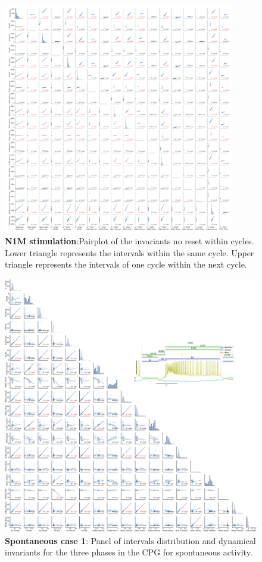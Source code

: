 \begin{figure}[htbp]
	\centering
	\includegraphics[width=0.9\textwidth]{./invariants/data/MODEL/n1m_driven/images/3phases/_output_pairplot_reset.png}
	\caption{\textbf{N1M stimulation}:Pairplot of the invariants no reset within cycles. Lower triangle represents the intervals within the same cycle. Upper triangle represents the intervals of one cycle within the next cycle. }
	\label{fig:N1M stimulation pairplot reset}
\end{figure}

\begin{figure}[htbp]
	\centering
	\includegraphics[width=\textwidth]{./img/invariants/data/SUSSEX/prep2/images/3phases/panel_with_pairplot.pdf}
	\caption{\textbf{Spontaneous case 1}: Panel of intervals distribution and dynamical invariants for the three phases in the CPG for spontaneous activity.}
	\label{fig:prep2 pairplot invariants}
\end{figure}



